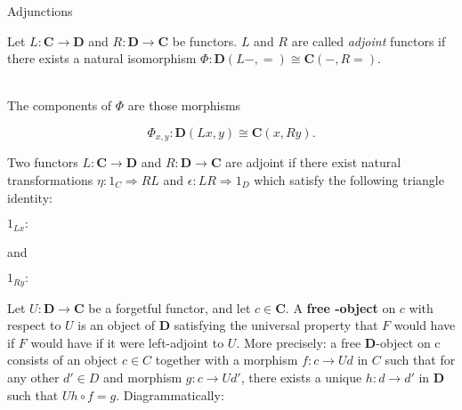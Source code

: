 \documentclass[tikz]{beamer}
\theoremstyle{definition}
\newcommand{\cat}[1]{\mathbf{#1}}
\begin{document}
\begin{frame}{Adjunctions}
   
   \begin{definition}[Adjunction]
        Let $L: \cat{C} \to \cat{D}$ and $R : \cat{D} \to \cat{C}$ be functors. $L$ and $R$ are called \textit{adjoint} functors if
        there exists a natural isomorphism $\Phi : \cat{D}(L-, =) \cong \cat{C}(-, R=)$. 
   \end{definition}{} 
\\  
The components of $\Phi$ are those morphisms 

\begin{equation*}
    \Phi_{x,y}: \cat{D}(Lx, y) \cong \cat{C}(x, Ry).
\end{equation*}
\end{frame}{}

\begin{frame}[fragile]
   
   \begin{definition}
    Two functors $L: \cat{C} \to \cat{D}$ and $R : \cat{D} \to \cat{C}$ are adjoint if there exist natural transformations $\eta : 1_C \Rightarrow RL $ and $\epsilon : LR \Rightarrow 1_D$ which satisfy the following triangle identity: 
    
    \begin{center}
        $1_{Lx}:$ 
    \end{center}
    
    and 
    \begin{center}
        $1_{Ry}:$ 
    \end{center}
   \end{definition}

\end{frame}

\begin{frame}[fragile]

Let $U: \cat{D} \to \cat{C}$ be a forgetful functor, and let $c \in \cat{C}$. A \textbf{free \cat{D}-object} on $c$ with respect to $U$
is an object of $\cat{D}$ satisfying the universal property that $F$ would have if $F$ would have if it were left-adjoint to $U$. More precisely: a free $\cat{D}$-object on c consists of an object $c \in C$ together with a morphism $f:c \to Ud$ in $C$ such that for any other $d' \in D$ and morphism $g:c \to Ud'$, there exists a unique $h:d \to d'$ in $\cat{D}$ such that $Uh \circ f = g$. Diagrammatically: 

\begin{center}
\end{center}
\end{frame}
\end{document}

